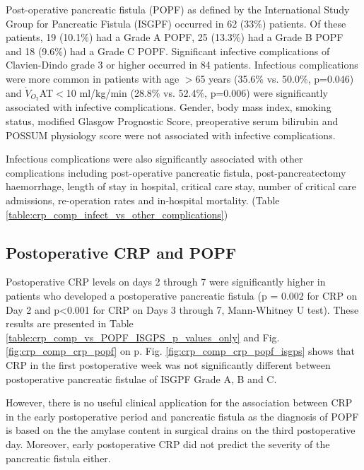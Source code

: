 Post-operative pancreatic fistula (POPF) as defined by the International Study Group for Pancreatic Fistula (ISGPF) occurred in 62 (33\%) patients. Of these patients, 19 (10.1\%) had a Grade A POPF, 25 (13.3\%) had a Grade B POPF and 18 (9.6\%) had a Grade C POPF. Significant infective complications of Clavien-Dindo grade 3 or higher occurred in 84 patients. Infectious complications were more common in patients with age $>$65 years (35.6\% vs. 50.0\%, p=0.046) and $\dot{V}_{O_2}$AT$<$10 ml/kg/min (28.8\% vs. 52.4\%, p=0.006) were significantly associated with infective complications. Gender, body mass index, smoking status, modified Glasgow Prognostic Score, preoperative serum bilirubin and POSSUM physiology score were not associated with infective complications.

Infectious complications were also significantly associated with other complications including post-operative pancreatic fistula, post-pancreatectomy haemorrhage, length of stay in hospital, critical care stay, number of critical care admissions, re-operation rates and in-hospital mortality. (Table \ref{table:crp_comp_infect_vs_other_complications})




\subsection{Postoperative CRP and POPF}
Postoperative CRP levels on days 2 through 7 were significantly higher in patients who developed a postoperative pancreatic fistula (p = 0.002 for CRP on Day 2 and p<0.001 for CRP on Days 3 through 7, Mann-Whitney U test). These results are presented in Table \ref{table:crp_comp_vs_POPF_ISGPS_p_values_only} and Fig. \ref{fig:crp_comp_crp_popf} on p\pageref{fig:crp_comp_crp_popf}. Fig. \ref{fig:crp_comp_crp_popf_isgps} shows that CRP in the first postoperative week was not significantly different between postoperative pancreatic fistulae of ISGPF Grade A, B and C. 

However, there is no useful clinical application for the association between CRP in the early postoperative period and  pancreatic fistula as the diagnosis of POPF is based on the the amylase content in surgical drains on the third postoperative day. Moreover, early postoperative CRP did not predict the severity of the pancreatic fistula either.

